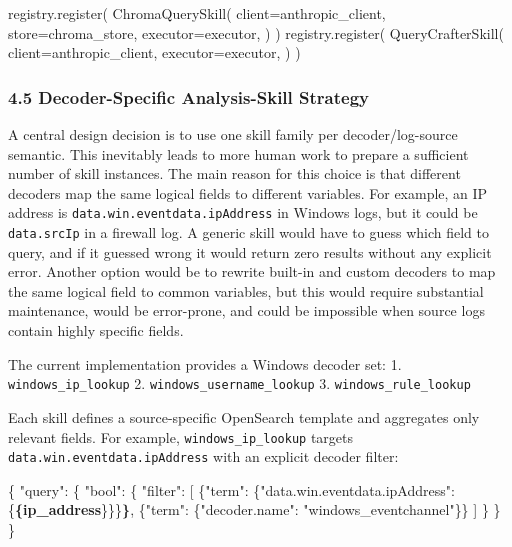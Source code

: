 \documentclass[
]{article}
\newenvironment{Shaded}{}{}
\newcommand{\DataTypeTok}[1]{\textcolor[rgb]{0.56,0.13,0.00}{#1}}
\newcommand{\ErrorTok}[1]{\textcolor[rgb]{1.00,0.00,0.00}{\textbf{#1}}}
\newcommand{\FunctionTok}[1]{\textcolor[rgb]{0.02,0.16,0.49}{#1}}
\newcommand{\NormalTok}[1]{#1}
\newcommand{\OperatorTok}[1]{\textcolor[rgb]{0.40,0.40,0.40}{#1}}
\newcommand{\OtherTok}[1]{\textcolor[rgb]{0.00,0.44,0.13}{#1}}
\newcommand{\StringTok}[1]{\textcolor[rgb]{0.25,0.44,0.63}{#1}}
\begin{document}
\begin{Shaded}
\begin{Highlighting}[]
\NormalTok{registry.register(}
\NormalTok{    ChromaQuerySkill(}
\NormalTok{        client}\OperatorTok{=}\NormalTok{anthropic\_client,}
\NormalTok{        store}\OperatorTok{=}\NormalTok{chroma\_store,}
\NormalTok{        executor}\OperatorTok{=}\NormalTok{executor,}
\NormalTok{    )}
\NormalTok{)}
\NormalTok{registry.register(}
\NormalTok{    QueryCrafterSkill(}
\NormalTok{        client}\OperatorTok{=}\NormalTok{anthropic\_client,}
\NormalTok{        executor}\OperatorTok{=}\NormalTok{executor,}
\NormalTok{    )}
\NormalTok{)}
\end{Highlighting}
\end{Shaded}

\subsubsection{4.5 Decoder-Specific Analysis-Skill
Strategy}\label{decoder-specific-analysis-skill-strategy}

A central design decision is to use one skill family per
decoder/log-source semantic. This inevitably leads to more human work to
prepare a sufficient number of skill instances. The main reason for this
choice is that different decoders map the same logical fields to
different variables. For example, an IP address is
\texttt{data.win.eventdata.ipAddress} in Windows logs, but it could be
\texttt{data.srcIp} in a firewall log. A generic skill would have to
guess which field to query, and if it guessed wrong it would return zero
results without any explicit error. Another option would be to rewrite
built-in and custom decoders to map the same logical field to common
variables, but this would require substantial maintenance, would be
error-prone, and could be impossible when source logs contain highly
specific fields.

The current implementation provides a Windows decoder set: 1.
\texttt{windows\_ip\_lookup} 2. \texttt{windows\_username\_lookup} 3.
\texttt{windows\_rule\_lookup}

Each skill defines a source-specific OpenSearch template and aggregates
only relevant fields. For example, \texttt{windows\_ip\_lookup} targets
\texttt{data.win.eventdata.ipAddress} with an explicit decoder filter:

\begin{Shaded}
\begin{Highlighting}[]
\FunctionTok{\{}
  \DataTypeTok{"query"}\FunctionTok{:} \FunctionTok{\{}
    \DataTypeTok{"bool"}\FunctionTok{:} \FunctionTok{\{}
      \DataTypeTok{"filter"}\FunctionTok{:} \OtherTok{[}
        \FunctionTok{\{}\DataTypeTok{"term"}\FunctionTok{:} \FunctionTok{\{}\DataTypeTok{"data.win.eventdata.ipAddress"}\FunctionTok{:} \FunctionTok{\{}\ErrorTok{\{ip\_address}\FunctionTok{\}\}\}}\ErrorTok{\}}\OtherTok{,}
        \FunctionTok{\{}\DataTypeTok{"term"}\FunctionTok{:} \FunctionTok{\{}\DataTypeTok{"decoder.name"}\FunctionTok{:} \StringTok{"windows\_eventchannel"}\FunctionTok{\}\}}
      \OtherTok{]}
    \FunctionTok{\}}
  \FunctionTok{\}}
\FunctionTok{\}}
\end{Highlighting}
\end{Shaded}
\end{document}
